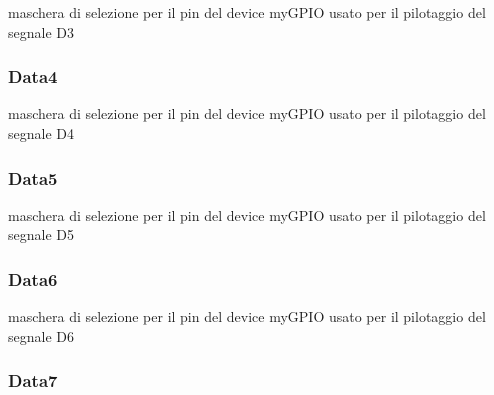 maschera di selezione per il pin del device my\+G\+P\+I\+O usato per il pilotaggio del segnale D3 \hypertarget{struct_h_d44780___l_c_d__t_a558b10ea85ca2ed99e34d38a2b4cf388}{
\subsubsection[{Data4}]{ Data4}}\label{struct_h_d44780___l_c_d__t_a558b10ea85ca2ed99e34d38a2b4cf388}
maschera di selezione per il pin del device my\+G\+P\+I\+O usato per il pilotaggio del segnale D4 \hypertarget{struct_h_d44780___l_c_d__t_abebc68d092e3d1c115ecb22f7ac91f4b}{
\subsubsection[{Data5}]{ Data5}}\label{struct_h_d44780___l_c_d__t_abebc68d092e3d1c115ecb22f7ac91f4b}
maschera di selezione per il pin del device my\+G\+P\+I\+O usato per il pilotaggio del segnale D5 \hypertarget{struct_h_d44780___l_c_d__t_aab366da5e8192bd7c5dd9194aa2d6fde}{
\subsubsection[{Data6}]{ Data6}}\label{struct_h_d44780___l_c_d__t_aab366da5e8192bd7c5dd9194aa2d6fde}
maschera di selezione per il pin del device my\+G\+P\+I\+O usato per il pilotaggio del segnale D6 \hypertarget{struct_h_d44780___l_c_d__t_a0709183e63889cacaf3149c60ff6cb7d}{
\subsubsection[{Data7}]{ Data7}}\label{struct_h_d44780___l_c_d__t_a0709183e63889cacaf3149c60ff6cb7d}
